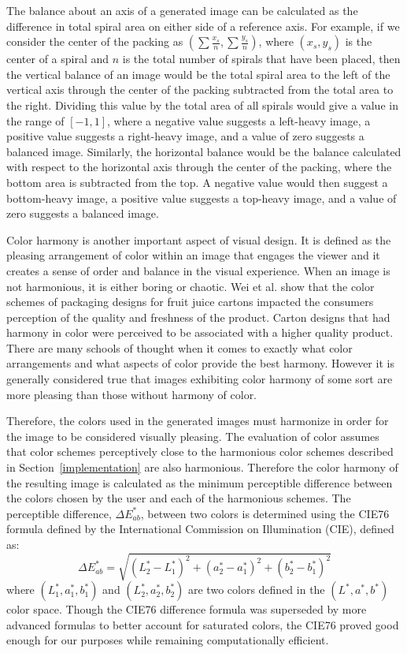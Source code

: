 \documentclass[11pt]{IEEEtran}
\begin{document}
The balance about an axis of a generated image can be calculated as the difference in total spiral area on either side of a reference axis. For example, if we consider the center of the packing as $(\sum\frac{x_{s}}{n}, \sum\frac{y_{s}}{n})$, where $(x_{s}, y_{s})$ is the center of a spiral and $n$ is the total number of spirals that have been placed, then the vertical balance of an image would be the total spiral area to the left of the vertical axis through the center of the packing subtracted from the total area to the right. Dividing this value by the total area of all spirals would give a value in the range of $[-1, 1]$, where a negative value suggests a left-heavy image, a positive value suggests a right-heavy image, and a value of zero suggests a balanced image. Similarly, the horizontal balance would be the balance calculated with respect to the horizontal axis through the center of the packing, where the bottom area is subtracted from the top. A negative value would then suggest a bottom-heavy image, a positive value suggests a top-heavy image, and a value of zero suggests a balanced image.

Color harmony is another important aspect of visual design. It is defined as the pleasing arrangement of color within an image that engages the viewer and it creates a sense of order and balance in the visual experience. When an image is not harmonious, it is either boring or chaotic. Wei et al. show that the color schemes of packaging designs for fruit juice cartons impacted the consumers perception of the quality and freshness of the product. Carton designs that had harmony in color were perceived to be associated with a higher quality product.\cite{wei2014} There are many schools of thought when it comes to exactly what color arrangements and what aspects of color provide the best harmony. However it is generally considered true that images exhibiting color harmony of some sort are more pleasing than those without harmony of color. \cite{westland2007}

Therefore, the colors used in the generated images must harmonize in order for the image to be considered visually pleasing. The evaluation of color assumes that color schemes perceptively close to the harmonious color schemes described in Section~\ref{implementation} are also harmonious. Therefore the color harmony of the resulting image is calculated as the minimum perceptible difference between the colors chosen by the user and each of the harmonious schemes. The perceptible difference, $\Delta E_{ab}^{*}$, between two colors is determined using the CIE76 formula defined by the International Commission on Illumination (CIE), defined as: 
\begin{equation}
\Delta E_{ab}^{*} = \sqrt{(L_{2}^{*}-L_{1}^{*})^2 + (a_{2}^{*}-a_{1}^{*})^2 + (b_{2}^{*}-b_{1}^{*})^2}
\end{equation}
where $(L_{1}^{*}, a_{1}^{*}, b_{1}^{*})$ and $(L_{2}^{*}, a_{2}^{*}, b_{2}^{*})$ are two colors defined in the $(L^{*}, a^{*}, b^{*})$ color space. Though the CIE76 difference formula was superseded by more advanced formulas to better account for saturated colors, the CIE76 proved good enough for our purposes while remaining computationally efficient.
 
\end{document}
